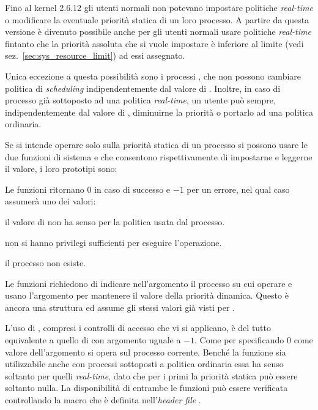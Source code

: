 Fino al kernel 2.6.12 gli utenti normali non potevano impostare politiche
\textit{real-time} o modificare la eventuale priorità statica di un loro
processo. A partire da questa versione è divenuto possibile anche per gli
utenti normali usare politiche \textit{real-time} fintanto che la priorità
assoluta che si vuole impostare è inferiore al limite 
(vedi sez.~\ref{sec:sys_resource_limit}) ad essi assegnato. 

Unica eccezione a questa possibilità sono i processi , che
non possono cambiare politica di \textit{scheduling} indipendentemente dal
valore di . Inoltre, in caso di processo già sottoposto
ad una politica \textit{real-time}, un utente può sempre, indipendentemente
dal valore di , diminuirne la priorità o portarlo ad una
politica ordinaria.

Se si intende operare solo sulla priorità statica di un processo si possono
usare le due funzioni di sistema  e
 che consentono rispettivamente di impostarne e
leggerne il valore, i loro prototipi sono:

\begin{funcproto}{
}
{Le funzioni ritornano $0$ in caso di successo e $-1$ per un errore, nel qual
caso  assumerà uno dei valori:
\begin{errlist}
\item[\errcode{EINVAL}] il valore di  non ha senso per la
  politica usata dal processo.
\item[\errcode{EPERM}] non si hanno privilegi sufficienti per eseguire
  l'operazione.
\item[\errcode{ESRCH}] il processo  non esiste.
\end{errlist}}
\end{funcproto}

Le funzioni richiedono di indicare nell'argomento  il processo su
cui operare e usano l'argomento  per mantenere il valore della
priorità dinamica. Questo è ancora una struttura  ed
assume gli stessi valori già visti per .

L'uso di , compresi i controlli di accesso che vi si
applicano, è del tutto equivalente a quello di  con
argomento  uguale a $-1$. Come per 
specificando $0$ come valore dell'argomento  si opera sul processo
corrente. Benché la funzione sia utilizzabile anche con processi sottoposti a
politica ordinaria essa ha senso soltanto per quelli \textit{real-time}, dato
che per i primi la priorità statica può essere soltanto nulla.  La
disponibilità di entrambe le funzioni può essere verificata controllando la
macro  che è definita nell'\textit{header
  file} .

